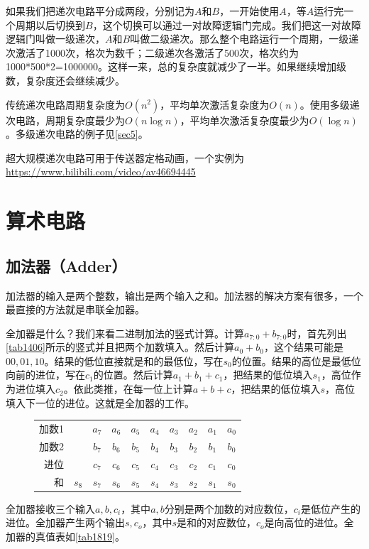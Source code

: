 如果我们把递次电路平分成两段，分别记为$A$和$B$，一开始使用$A$，等$A$运行完一个周期以后切换到$B$，这个切换可以通过一对故障逻辑门完成。我们把这一对故障逻辑门叫做一级递次，$A$和$B$叫做二级递次。那么整个电路运行一个周期，一级递次激活了1000次，格次为数千；二级递次各激活了500次，格次约为1000*500*2=1000000。这样一来，总的复杂度就减少了一半。如果继续增加级数，复杂度还会继续减少。

传统递次电路周期复杂度为$O(n^2)$，平均单次激活复杂度为$O(n)$。使用多级递次电路，周期复杂度最少为$O(n\log n)$，平均单次激活复杂度最少为$O(\log n)$。多级递次电路的例子见\autoref{sec5}。

超大规模递次电路可用于传送器定格动画，一个实例为\url{https://www.bilibili.com/video/av46694445}

\section{算术电路}

\subsection{加法器（Adder）}
加法器的输入是两个整数，输出是两个输入之和。加法器的解决方案有很多，一个最直接的方法就是串联全加器。

全加器是什么？我们来看二进制加法的竖式计算。计算$a_{7:0}+b_{7:0}$时，首先列出\autoref{tab1406}所示的竖式并且把两个加数填入。然后计算$a_0+b_0$，这个结果可能是$00,01,10$。结果的低位直接就是和的最低位，写在$s_0$的位置。结果的高位是最低位向前的进位，写在$c_1$的位置。然后计算$a_1+b_1+c_1$，把结果的低位填入$s_1$，高位作为进位填入$c_2$。依此类推，在每一位上计算$a+b+c$，把结果的低位填入$s$，高位填入下一位的进位。这就是全加器的工作。

\begin{figure}[!h]
\centering
\begin{tabular}{rccccccccc}
加数1&&$a_7$&$a_6$&$a_5$&$a_4$&$a_3$&$a_2$&$a_1$&$a_0$\\
加数2&&$b_7$&$b_6$&$b_5$&$b_4$&$b_3$&$b_2$&$b_1$&$b_0$\\
进位&&$c_7$&$c_6$&$c_5$&$c_4$&$c_3$&$c_2$&$c_1$&$c_0$\\\hline
和&$s_8$&$s_7$&$s_6$&$s_5$&$s_4$&$s_3$&$s_2$&$s_1$&$s_0$
\end{tabular}
\caption{}\label{tab1406}
\end{figure}

全加器接收三个输入$a,b,c_i$，其中$a,b$分别是两个加数的对应数位，$c_i$是低位产生的进位。全加器产生两个输出$s,c_o$，其中$s$是和的对应数位，$c_o$是向高位的进位。全加器的真值表如\autoref{tab1819}。

